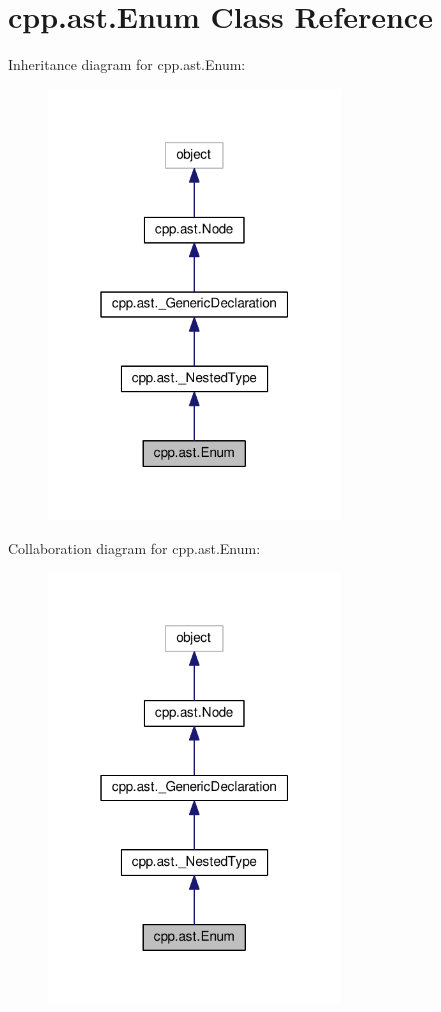 \hypertarget{classcpp_1_1ast_1_1Enum}{}\section{cpp.\+ast.\+Enum Class Reference}
\label{classcpp_1_1ast_1_1Enum}


Inheritance diagram for cpp.\+ast.\+Enum\+:
\nopagebreak
\begin{figure}[H]
\begin{center}
\leavevmode
\includegraphics[width=220pt]{classcpp_1_1ast_1_1Enum__inherit__graph}
\end{center}
\end{figure}


Collaboration diagram for cpp.\+ast.\+Enum\+:
\nopagebreak
\begin{figure}[H]
\begin{center}
\leavevmode
\includegraphics[width=220pt]{classcpp_1_1ast_1_1Enum__coll__graph}
\end{center}
\end{figure}
